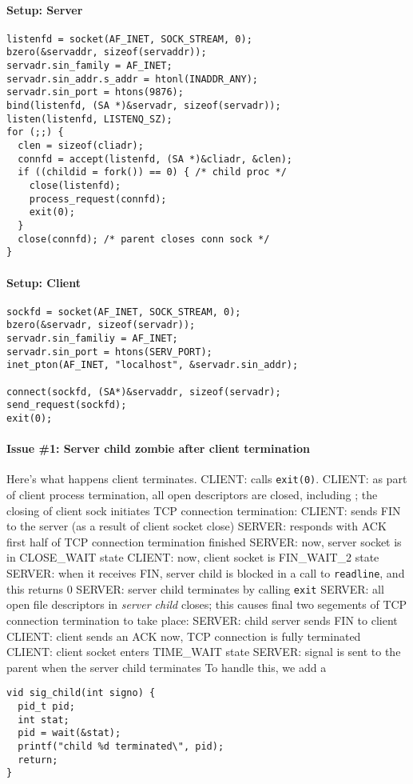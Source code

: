 \documentclass{memo}
\begin{document}
\small
{}

\paragraph{Setup: Server}
\begin{verbatim}
listenfd = socket(AF_INET, SOCK_STREAM, 0);
bzero(&servaddr, sizeof(servaddr));
servadr.sin_family = AF_INET;
servadr.sin_addr.s_addr = htonl(INADDR_ANY);
servadr.sin_port = htons(9876);
bind(listenfd, (SA *)&servadr, sizeof(servadr));
listen(listenfd, LISTENQ_SZ);
for (;;) {
  clen = sizeof(cliadr);
  connfd = accept(listenfd, (SA *)&cliadr, &clen);
  if ((childid = fork()) == 0) { /* child proc */
    close(listenfd);
    process_request(connfd);
    exit(0);
  }
  close(connfd); /* parent closes conn sock */
}
\end{verbatim}


\paragraph{Setup: Client}
\begin{verbatim}
sockfd = socket(AF_INET, SOCK_STREAM, 0);
bzero(&servadr, sizeof(servadr));
servadr.sin_familiy = AF_INET;
servadr.sin_port = htons(SERV_PORT);
inet_pton(AF_INET, "localhost", &servadr.sin_addr);

connect(sockfd, (SA*)&servaddr, sizeof(servadr);
send_request(sockfd);
exit(0);
\end{verbatim}

\paragraph{Issue \#1: Server child zombie after client termination}
Here's what happens client terminates.
\ben
\w CLIENT:  calls \verb+exit(0)+.
\w CLIENT: as part of client process termination, all open descriptors are
closed, including ; the closing of client sock initiates TCP
connection termination:
   \ben
   \w CLIENT: sends FIN to the server (as a result of client socket close)
   \w SERVER: responds with ACK
   \w first half of TCP connection termination finished
   \w SERVER: now, server socket is in CLOSE\_WAIT state
   \w CLIENT: now, client socket is FIN\_WAIT\_2 state
   \een
\w SERVER: when it receives FIN, server child is blocked in a call to
   \verb+readline+, and this returns 0 
\w SERVER: server child terminates by calling \verb+exit+
\w SERVER: all open file descriptors in {\em server child\/} closes; this
causes final two segements of TCP connection termination to take place:
   \ben
   \w SERVER: child server sends FIN to client
   \w CLIENT: client sends an ACK
   \w now, TCP connection is fully terminated
   \w CLIENT: client socket enters TIME\_WAIT state
   \een
\w SERVER:  signal is sent to the parent when the server child
terminates 
\een
To handle this, we add a 
\begin{verbatim}
vid sig_child(int signo) {
  pid_t pid;
  int stat;
  pid = wait(&stat);
  printf("child %d terminated\", pid);
  return;
}
\end{verbatim}
\end{document}
